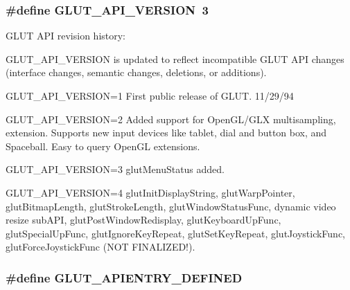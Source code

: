 \subsubsection[{G\+L\+U\+T\+\_\+\+A\+P\+I\+\_\+\+V\+E\+R\+S\+I\+ON}]{\setlength{\rightskip}{0pt plus 5cm}\#define G\+L\+U\+T\+\_\+\+A\+P\+I\+\_\+\+V\+E\+R\+S\+I\+ON~3}\label{glut_8h_a2fc3bb51b9f38ac5b0cb7911be9caf94}
G\+L\+UT A\+PI revision history\+:

G\+L\+U\+T\+\_\+\+A\+P\+I\+\_\+\+V\+E\+R\+S\+I\+ON is updated to reflect incompatible G\+L\+UT A\+PI changes (interface changes, semantic changes, deletions, or additions).

G\+L\+U\+T\+\_\+\+A\+P\+I\+\_\+\+V\+E\+R\+S\+I\+ON=1 First public release of G\+L\+UT. 11/29/94

G\+L\+U\+T\+\_\+\+A\+P\+I\+\_\+\+V\+E\+R\+S\+I\+ON=2 Added support for Open\+G\+L/\+G\+LX multisampling, extension. Supports new input devices like tablet, dial and button box, and Spaceball. Easy to query Open\+GL extensions.

G\+L\+U\+T\+\_\+\+A\+P\+I\+\_\+\+V\+E\+R\+S\+I\+ON=3 glut\+Menu\+Status added.

G\+L\+U\+T\+\_\+\+A\+P\+I\+\_\+\+V\+E\+R\+S\+I\+ON=4 glut\+Init\+Display\+String, glut\+Warp\+Pointer, glut\+Bitmap\+Length, glut\+Stroke\+Length, glut\+Window\+Status\+Func, dynamic video resize sub\+A\+PI, glut\+Post\+Window\+Redisplay, glut\+Keyboard\+Up\+Func, glut\+Special\+Up\+Func, glut\+Ignore\+Key\+Repeat, glut\+Set\+Key\+Repeat, glut\+Joystick\+Func, glut\+Force\+Joystick\+Func (N\+OT F\+I\+N\+A\+L\+I\+Z\+E\+D!). 
\subsubsection[{G\+L\+U\+T\+\_\+\+A\+P\+I\+E\+N\+T\+R\+Y\+\_\+\+D\+E\+F\+I\+N\+ED}]{\setlength{\rightskip}{0pt plus 5cm}\#define G\+L\+U\+T\+\_\+\+A\+P\+I\+E\+N\+T\+R\+Y\+\_\+\+D\+E\+F\+I\+N\+ED}\label{glut_8h_aaf538c0b5f6a3d6f0cbf54ff6740f42e}
